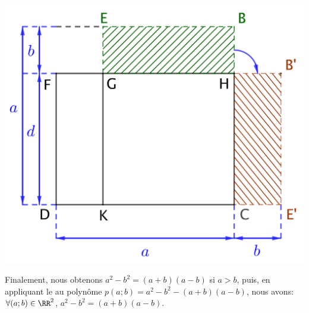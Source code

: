 \begin{example}
	\begin{center}
		\includegraphics[scale = .7]{(a-b)(a-b)-sep.png}
	\end{center}

	Finalement, nous obtenons $a^2 - b^2 = (a+b)(a-b)$ si $a > b$,
	puis,
	en appliquant le  au polynôme $p(a ; b) = a^2 - b^2 - (a+b)(a-b)$,
	nous avons:
	$\forall (a ; b) \in \RR^2$, $a^2 - b^2 = (a+b)(a-b)$.
\end{example}




